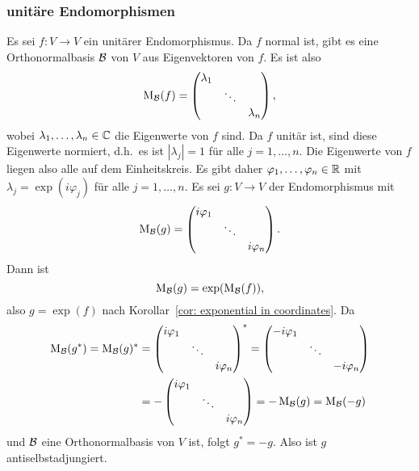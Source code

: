 \documentclass[a4paper, 10pt, numbers=noenddot]{scrartcl}
\begin{document}
\subsubsection{unitäre Endomorphismen}
Es sei $f \colon V \to V$ ein unitärer Endomorphismus.
Da $f$ normal ist, gibt es eine Orthonormalbasis $\mathcal{B}$ von $V$ aus Eigenvektoren von $f$.
Es ist also
\[
  \operatorname{M}_{\mathcal{B}}(f)
  =
  \begin{pmatrix}
    \lambda_1 &         &           \\
              & \ddots  &           \\
              &         & \lambda_n
  \end{pmatrix},
\]
wobei $\lambda_1, \dotsc, \lambda_n \in \mathbb{C}$ die Eigenwerte von $f$ sind.
Da $f$ unitär ist, sind diese Eigenwerte normiert, d.h.\ es ist $|\lambda_j| = 1$ für alle $j = 1, \dotsc, n$.
Die Eigenwerte von $f$ liegen also alle auf dem Einheitskreis.
Es gibt daher $\varphi_1, \dotsc, \varphi_n \in \mathbb{R}$ mit $\lambda_j = \exp(i \varphi_j)$ für alle $j = 1, \dotsc, n$.
Es sei $g \colon V \to V$ der Endomorphismus mit
\[
  \operatorname{M}_{\mathcal{B}}(g)
  =
  \begin{pmatrix}
    i \varphi_1 &         &             \\
                & \ddots  &             \\
                &         & i \varphi_n
  \end{pmatrix}.
\]
Dann ist
\[
  \operatorname{M}_{\mathcal{B}}(g) = \exp( \operatorname{M}_{\mathcal{B}}(f) ),
\]
also $g = \exp(f)$ nach Korollar~\ref{cor: exponential in coordinates}.
Da
\begin{align*}
  \operatorname{M}_{\mathcal{B}}(g^*)
  =
  \operatorname{M}_{\mathcal{B}}(g)^*
  &=
  \begin{pmatrix}
    i \varphi_1 &         &             \\
                & \ddots  &             \\
                &         & i \varphi_n
  \end{pmatrix}^*
  =
  \begin{pmatrix}
    - i \varphi_1 &         &               \\
                  & \ddots  &               \\
                  &         & - i \varphi_n
  \end{pmatrix}
  \\
  &=
  -
  \begin{pmatrix}
    i \varphi_1 &         &             \\
                & \ddots  &             \\
                &         & i \varphi_n
  \end{pmatrix}
  =
  -\operatorname{M}_{\mathcal{B}}(g)
  =
  \operatorname{M}_{\mathcal{B}}(-g)
\end{align*}
und $\mathcal{B}$ eine Orthonormalbasis von $V$ ist, folgt $g^* = -g$.
Also ist $g$ antiselbstadjungiert.
\end{document}
